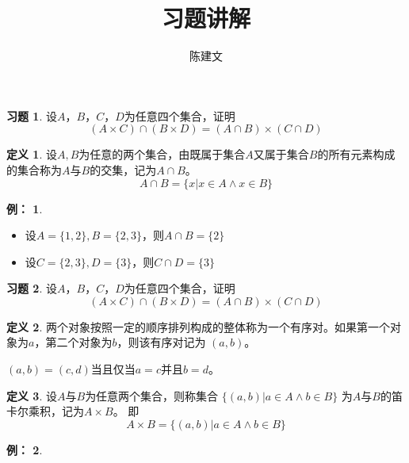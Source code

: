 \documentclass{beamer}
\begin{document}
\begin{CJK*}{UTF8}{gbsn}

\newtheorem{Thm}{定理}[section]
\theoremstyle{definition}
\newtheorem{Def}{定义}
\theoremstyle{example}
\newtheorem*{Ex}{例：}
\newtheorem*{Exercise}{习题}
\newtheorem{Exercise1}{习题}

\date{}
\author{陈建文}
\title{习题讲解}
\begin{frame}
  \titlepage
\end{frame}


\begin{frame}
    \begin{Exercise}
    设$A$，$B$，$C$，$D$为任意四个集合，证明
    \[(A\times C)\cap (B \times D) = (A\cap B) \times (C \cap D)\]
\end{Exercise}
\pause
  \begin{Def}
    设$A,B$为任意的两个集合，由既属于集合$A$又属于集合$B$的所有元素构成的集合称为$A$与$B$的\alert{交集}，记为$A \cap B$。
    \begin{equation*}
      A\cap B = \{x|x \in A \land x \in B\}
    \end{equation*}
  \end{Def}\pause
  \begin{Ex}
    \begin{itemize}
    \item 设$A=\{1,2\},B=\{2,3\}$，则$A \cap B = \{2\}$
    \item 设$C=\{2,3\},D=\{3\}$，则$C \cap D = \{3\}$
    \end{itemize}
    \end{Ex}
\end{frame}

\begin{frame}
    \begin{Exercise}
      设$A$，$B$，$C$，$D$为任意四个集合，证明
 \[(A\times C)\cap (B \times D) = (A\cap B) \times (C \cap D)\]
\end{Exercise}
\pause   
    \begin{Def}
    两个对象按照一定的顺序排列构成的整体称为一个\alert{有序对}。如果第一个对象为$a$，第二个对象为$b$，则该有序对记为 $(a,b)$。

    $(a,b)=(c,d)$当且仅当$a=c$并且$b=d$。
  \end{Def}\pause
  \begin{Def}
    设$A$与$B$为任意两个集合，则称集合 $\{(a,b)|a\in A \land b \in B\}$ 为$A$与$B$的\alert{笛卡尔乘积}，记为$A \times B$。
即
\begin{equation*}
  A \times B = \{(a,b)|a \in A \land b \in B\}
\end{equation*}
\end{Def}{\small
\begin{Ex}
    

\end{Ex}}
\end{frame}
\end{CJK*}
\end{document}
